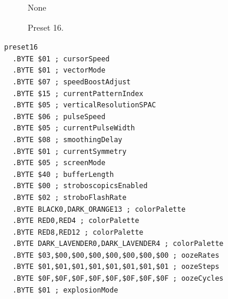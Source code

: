 \begin{minipage}[b]{0.48\linewidth}
\begin{figure}[H]                                                          
  \centering                                                             
  \begin{adjustbox}{width=5cm,center}                                   
	None
  \end{adjustbox}                                                        
\caption*{Preset 16.}                                           
\end{figure}                                                               
\end{minipage}
\hspace{0.1cm}
\begin{minipage}[b]{0.48\linewidth}                                       
\begin{lstlisting}[basicstyle=\ttfamily\tiny]
preset16
  .BYTE $01 ; cursorSpeed
  .BYTE $01 ; vectorMode
  .BYTE $07 ; speedBoostAdjust
  .BYTE $15 ; currentPatternIndex
  .BYTE $05 ; verticalResolutionSPAC
  .BYTE $06 ; pulseSpeed
  .BYTE $05 ; currentPulseWidth
  .BYTE $08 ; smoothingDelay
  .BYTE $01 ; currentSymmetry
  .BYTE $05 ; screenMode
  .BYTE $40 ; bufferLength
  .BYTE $00 ; stroboscopicsEnabled
  .BYTE $02 ; stroboFlashRate
  .BYTE BLACK0,DARK_ORANGE13 ; colorPalette
  .BYTE RED0,RED4 ; colorPalette
  .BYTE RED8,RED12 ; colorPalette
  .BYTE DARK_LAVENDER0,DARK_LAVENDER4 ; colorPalette
  .BYTE $03,$00,$00,$00,$00,$00,$00,$00 ; oozeRates
  .BYTE $01,$01,$01,$01,$01,$01,$01,$01 ; oozeSteps
  .BYTE $0F,$0F,$0F,$0F,$0F,$0F,$0F,$0F ; oozeCycles
  .BYTE $01 ; explosionMode
\end{lstlisting}
\end{minipage}

